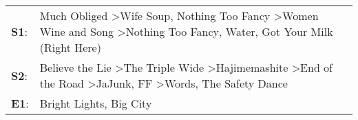 \begin{supertabular}{p{0.03\textwidth}p{0.92\textwidth}}
 \textbf{S1}:  &                                     Much Obliged\textsuperscript{} \textgreater \enspace Wife Soup\textsuperscript{}, \enspace Nothing Too Fancy\textsuperscript{} \textgreater \enspace Women Wine and Song\textsuperscript{} \textgreater \enspace Nothing Too Fancy\textsuperscript{}, \enspace Water\textsuperscript{}, \enspace Got Your Milk (Right Here)\textsuperscript{}  \enspace  \\
 \textbf{S2}:  &  Believe the Lie\textsuperscript{} \textgreater \enspace The Triple Wide\textsuperscript{} \textgreater \enspace Hajimemashite\textsuperscript{} \textgreater \enspace End of the Road\textsuperscript{} \textgreater \enspace JaJunk\textsuperscript{}, \enspace FF\textsuperscript{} \textgreater \enspace Words\textsuperscript{}, \enspace The Safety Dance\textsuperscript{}  \enspace  \\
 \textbf{E1}:  &                                                                                                                                                                                                                                                                                                                                         Bright Lights, Big City\textsuperscript{}  \enspace  \\
\end{supertabular}
